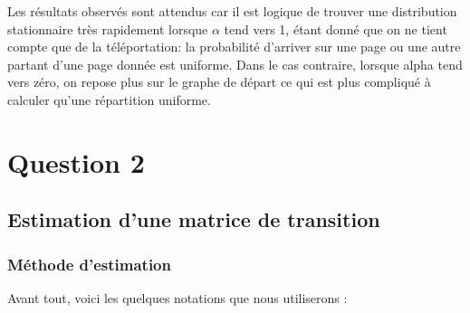 \documentclass[a4paper,titlepage]{report}
\begin{document}
Les résultats observés sont attendus car il est logique de trouver une distribution stationnaire très rapidement lorsque $\alpha$ tend vers 1, étant donné que on ne tient compte que de la téléportation: la probabilité d'arriver sur une page ou une autre partant d'une page donnée est uniforme. Dans le cas contraire, lorsque alpha tend vers zéro, on repose plus sur le graphe de départ ce qui est plus compliqué à calculer qu'une répartition uniforme.
\chapter{Question 2}
\section{Estimation d'une matrice de transition}
\subsection{Méthode d'estimation}
Avant tout, voici les quelques notations que nous utiliserons : 
\end{document}

